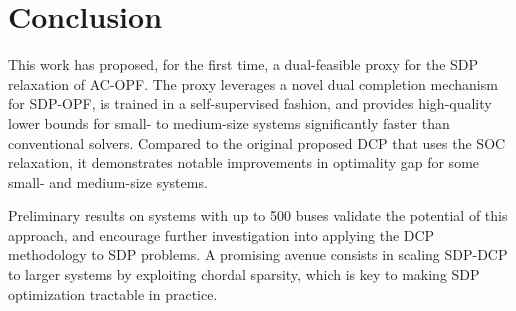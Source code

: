 \section{Conclusion}
\label{sec:conclusion}

This work has proposed, for the first time, a dual-feasible proxy for the SDP relaxation of AC-OPF.
The proxy leverages a novel dual completion mechanism for SDP-OPF, is trained in a self-supervised fashion, and provides high-quality lower bounds for small- to medium-size systems significantly faster than conventional solvers.
Compared to the original proposed DCP that uses the SOC relaxation, it demonstrates notable improvements in optimality gap for some small- and medium-size systems.

Preliminary results on systems with up to 500 buses validate the potential of this approach, and encourage further investigation into applying the DCP methodology to SDP problems.
A promising avenue consists in scaling SDP-DCP to larger systems by exploiting chordal sparsity, which is key to making SDP optimization tractable in practice.